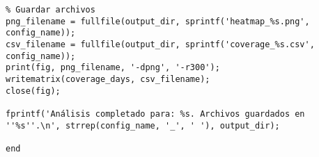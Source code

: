 \begin{verbatim}
% Guardar archivos
png_filename = fullfile(output_dir, sprintf('heatmap_%s.png', config_name));
csv_filename = fullfile(output_dir, sprintf('coverage_%s.csv', config_name));
print(fig, png_filename, '-dpng', '-r300');
writematrix(coverage_days, csv_filename);
close(fig);

fprintf('Análisis completado para: %s. Archivos guardados en ''%s''.\n', strrep(config_name, '_', ' '), output_dir);

end


\end{verbatim}